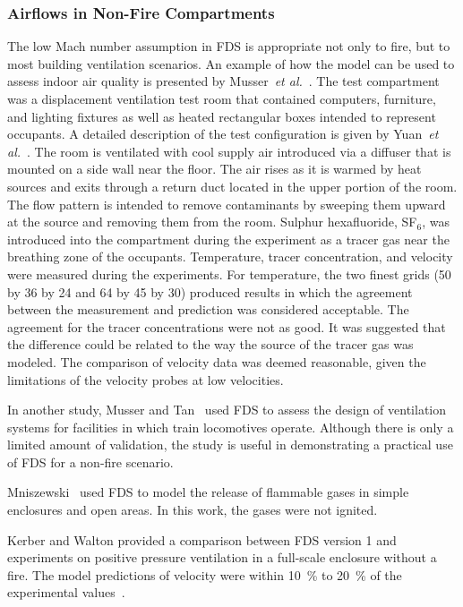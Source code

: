 \subsubsection{Airflows in Non-Fire Compartments}

The low Mach number assumption in FDS is appropriate not only to fire, but to  most building  ventilation scenarios.  An  example of  how the model
can  be used  to  assess indoor  air  quality  is presented  by Musser~{\em  et  al.}~\cite{Musser:1}.   The  test compartment  was  a displacement
ventilation  test   room   that  contained   computers, furniture, and  lighting fixtures as well as  heated rectangular boxes intended to  represent
occupants.  A detailed description  of the test configuration is  given by Yuan~{\em et  al.}~\cite{Yuan:1}.  The room is ventilated with  cool
supply air introduced via  a diffuser that is mounted on a side  wall near the floor. The air rises  as it is warmed by heat sources  and exits
through a return duct  located in the upper portion  of  the  room.  The   flow  pattern  is  intended  to  remove contaminants by sweeping  them
upward at the source  and removing them from the room.  Sulphur  hexafluoride, SF$_6$, was introduced into the compartment during the  experiment as
a tracer gas  near the breathing zone  of  the   occupants.   Temperature,  tracer  concentration,  and velocity were  measured during the
experiments.   For temperature, the two finest grids (50 by 36 by  24 and 64 by 45 by 30) produced results in  which the  agreement between  the
measurement  and  prediction was considered  acceptable.  The agreement  for the  tracer concentrations were  not as  good.  It  was suggested  that
the  difference  could be related to  the way  the source  of the tracer  gas was  modeled.  The comparison  of   velocity  data  was  deemed
reasonable,  given  the limitations of the velocity probes at low velocities.

In another  study, Musser and  Tan~\cite{Musser:2} used FDS  to assess the  design  of ventilation  systems  for  facilities  in which  train
locomotives  operate.  Although there  is  only  a  limited amount  of validation, the  study is useful  in demonstrating a practical  use of FDS for
a non-fire scenario.

Mniszewski~\cite{Mniszewski:1}  used  FDS  to  model  the  release  of flammable gases in simple enclosures and open areas. In this work, the gases
were not ignited.

Kerber  and Walton  provided a  comparison between  FDS version  1 and experiments on positive pressure ventilation in a full-scale enclosure without
a fire.   The model predictions of velocity  were within 10~\% to 20~\% of the experimental values~\cite{Kerber:1}.


